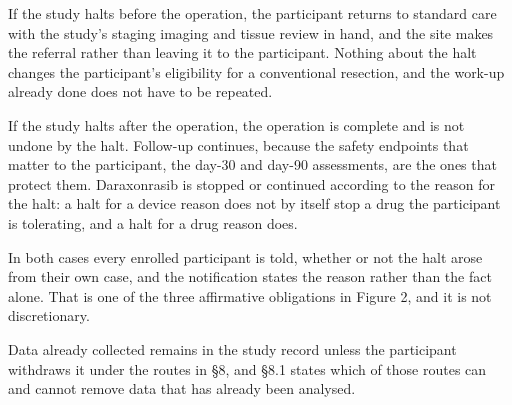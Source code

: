 If the study halts before the operation, the participant returns to standard
care with the study's staging imaging and tissue review in hand, and the site
makes the referral rather than leaving it to the participant. Nothing about the
halt changes the participant's eligibility for a conventional resection, and the
work-up already done does not have to be repeated.

If the study halts after the operation, the operation is complete and is not
undone by the halt. Follow-up continues, because the safety endpoints that
matter to the participant, the day-30 and day-90 assessments, are the ones that
protect them. Daraxonrasib is stopped or continued according to the reason for
the halt: a halt for a device reason does not by itself stop a drug the
participant is tolerating, and a halt for a drug reason does.

In both cases every enrolled participant is told, whether or not the halt arose
from their own case, and the notification states the reason rather than the fact
alone. That is one of the three affirmative obligations in Figure 2, and it is
not discretionary.

Data already collected remains in the study record unless the participant
withdraws it under the routes in \S 8, and \S 8.1 states which of those routes
can and cannot remove data that has already been analysed.
